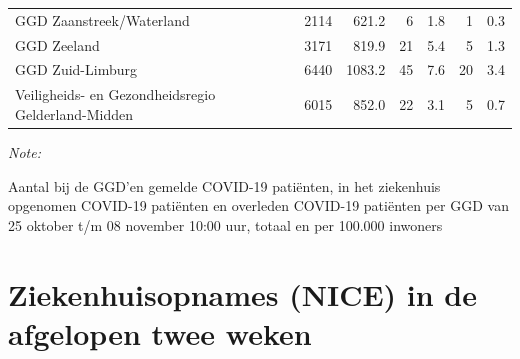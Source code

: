 \documentclass[
  english,
  man,floatsintext]{apa6}
\begin{document}
\begin{table}
\begin{threeparttable}
\begin{tabular}{lrrrrrr}
GGD Zaanstreek/Waterland & 2114 & 621.2 & 6 & 1.8 & 1 & 0.3\\
GGD Zeeland & 3171 & 819.9 & 21 & 5.4 & 5 & 1.3\\
GGD Zuid-Limburg & 6440 & 1083.2 & 45 & 7.6 & 20 & 3.4\\
Veiligheids- en Gezondheidsregio Gelderland-Midden & 6015 & 852.0 & 22 & 3.1 & 5 & 0.7\\
\bottomrule
\end{tabular}
\begin{tablenotes}
\item \textit{Note: } 
\item Aantal bij de GGD’en gemelde COVID-19 patiënten, in het ziekenhuis opgenomen COVID-19 patiënten en overleden COVID-19 patiënten per GGD van 25 oktober t/m 08 november 10:00 uur, totaal en per 100.000 inwoners
\end{tablenotes}
\end{threeparttable}
\endgroup{}
\end{table}

\newpage

\hypertarget{ziekenhuisopnames-nice-in-de-afgelopen-twee-weken}{%
\section{Ziekenhuisopnames (NICE) in de afgelopen twee weken}\label{ziekenhuisopnames-nice-in-de-afgelopen-twee-weken}}
\end{document}
